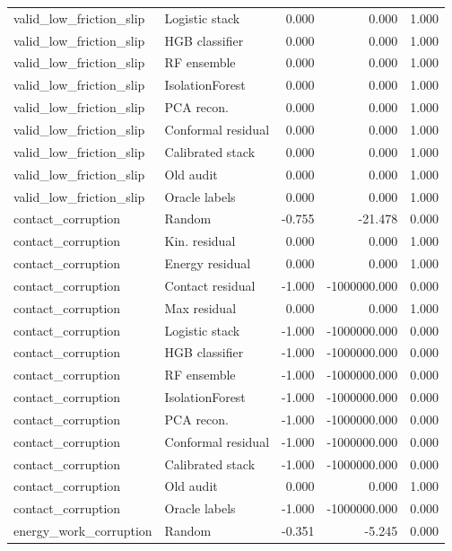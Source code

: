 {\begin{longtable}{llrrr}
valid\_low\_friction\_slip & Logistic stack & 0.000 & 0.000 & 1.000 \\
valid\_low\_friction\_slip & HGB classifier & 0.000 & 0.000 & 1.000 \\
valid\_low\_friction\_slip & RF ensemble & 0.000 & 0.000 & 1.000 \\
valid\_low\_friction\_slip & IsolationForest & 0.000 & 0.000 & 1.000 \\
valid\_low\_friction\_slip & PCA recon. & 0.000 & 0.000 & 1.000 \\
valid\_low\_friction\_slip & Conformal residual & 0.000 & 0.000 & 1.000 \\
valid\_low\_friction\_slip & Calibrated stack & 0.000 & 0.000 & 1.000 \\
valid\_low\_friction\_slip & Old audit & 0.000 & 0.000 & 1.000 \\
valid\_low\_friction\_slip & Oracle labels & 0.000 & 0.000 & 1.000 \\
contact\_corruption & Random & -0.755 & -21.478 & 0.000 \\
contact\_corruption & Kin. residual & 0.000 & 0.000 & 1.000 \\
contact\_corruption & Energy residual & 0.000 & 0.000 & 1.000 \\
contact\_corruption & Contact residual & -1.000 & -1000000.000 & 0.000 \\
contact\_corruption & Max residual & 0.000 & 0.000 & 1.000 \\
contact\_corruption & Logistic stack & -1.000 & -1000000.000 & 0.000 \\
contact\_corruption & HGB classifier & -1.000 & -1000000.000 & 0.000 \\
contact\_corruption & RF ensemble & -1.000 & -1000000.000 & 0.000 \\
contact\_corruption & IsolationForest & -1.000 & -1000000.000 & 0.000 \\
contact\_corruption & PCA recon. & -1.000 & -1000000.000 & 0.000 \\
contact\_corruption & Conformal residual & -1.000 & -1000000.000 & 0.000 \\
contact\_corruption & Calibrated stack & -1.000 & -1000000.000 & 0.000 \\
contact\_corruption & Old audit & 0.000 & 0.000 & 1.000 \\
contact\_corruption & Oracle labels & -1.000 & -1000000.000 & 0.000 \\
energy\_work\_corruption & Random & -0.351 & -5.245 & 0.000 \\

\end{longtable}}
